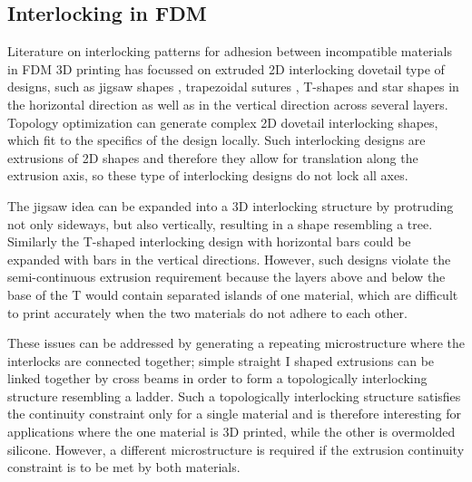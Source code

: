 \subsection{Interlocking in FDM}

Literature on interlocking patterns for adhesion between incompatible materials in FDM 3D printing has focussed on extruded 2D interlocking dovetail type of designs,
such as jigsaw shapes \cite{malik2017}, trapezoidal sutures \cite{Li2013}, T-shapes\cite{Ribeiro2019,mustafa2021development} and star shapes\cite{Wang2021} in the horizontal direction
as well as in the vertical direction across several layers\cite{debora2020}.
Topology optimization can generate complex 2D dovetail interlocking shapes, which fit to the specifics of the design locally\cite{aharoni2021}.
Such interlocking designs are extrusions of 2D shapes and therefore they allow for translation along the extrusion axis, so these type of interlocking designs do not lock all axes.

The jigsaw idea can be expanded into a 3D interlocking structure by protruding not only sideways, but also vertically, resulting in a shape resembling a tree\cite{gouker2006manufacturing}.
Similarly the T-shaped interlocking design with horizontal bars could be expanded with bars in the vertical directions.
However, such designs violate the semi-continuous extrusion requirement because the layers above and below the base of the T would contain separated islands of one material, 
which are difficult to print accurately when the two materials do not adhere to each other.

These issues can be addressed by generating a repeating microstructure where the interlocks are connected together;
simple straight I shaped extrusions can be linked together by cross beams in order to form a topologically interlocking structure resembling a ladder\cite{Rossing2020}.
Such a topologically interlocking structure satisfies the continuity constraint only for a single material and is therefore interesting for applications where the one material is 3D printed, while the other is overmolded silicone.
However, a different microstructure is required if the extrusion continuity constraint is to be met by both materials.



